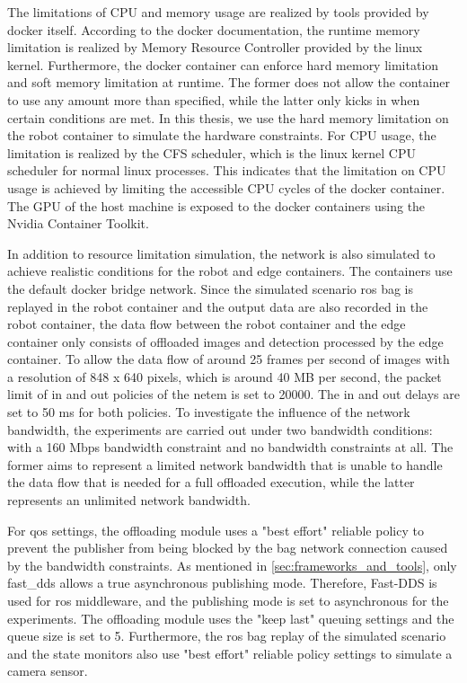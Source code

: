 The limitations of CPU and memory usage are realized by tools provided by \gls{docker} itself. According to the \gls{docker} documentation, the runtime memory limitation is realized by Memory Resource Controller provided by the \gls{linux} kernel. Furthermore, the \gls{docker} container can enforce hard memory limitation and soft memory limitation at runtime. The former does not allow the container to use any amount more than specified, while the latter only kicks in when certain conditions are met. In this thesis, we use the hard memory limitation on the robot container to simulate the hardware constraints. For CPU usage, the limitation is realized by the CFS scheduler, which is the \gls{linux} kernel CPU scheduler for normal \gls{linux} processes. This indicates that the limitation on CPU usage is achieved by limiting the accessible CPU cycles of the \gls{docker} container. The GPU of the host machine is exposed to the \gls{docker} containers using the Nvidia Container Toolkit.

In addition to resource limitation simulation, the network is also simulated to achieve realistic conditions for the robot and edge containers. The containers use the default \gls{docker} bridge network. Since the simulated scenario \gls{ros} bag is replayed in the robot container and the output data are also recorded in the robot container, the data flow between the robot container and the edge container only consists of offloaded images and detection processed by the edge container. To allow the data flow of around 25 frames per second of images with a resolution of 848 x 640 pixels, which is around 40 MB per second, the packet limit of in and out policies of the \gls{netem} is set to 20000. The in and out delays are set to 50 ms for both policies. To investigate the influence of the network bandwidth, the experiments are carried out under two bandwidth conditions: with a 160 Mbps bandwidth constraint and no bandwidth constraints at all. The former aims to represent a limited network bandwidth that is unable to handle the data flow that is needed for a full offloaded execution, while the latter represents an unlimited network bandwidth. 

For \gls{qos} settings, the offloading module uses a "best effort" reliable policy to prevent the publisher from being blocked by the bag network connection caused by the bandwidth constraints. As mentioned in \cref{sec:frameworks_and_tools}, only \gls{fast_dds} allows a true asynchronous publishing mode. Therefore, Fast-DDS is used for \gls{ros} middleware, and the publishing mode is set to asynchronous for the experiments. The offloading module uses the "keep last" queuing settings and the queue size is set to 5. Furthermore, the \gls{ros} bag replay of the simulated scenario and the state monitors also use "best effort" reliable policy settings to simulate a camera sensor. 

